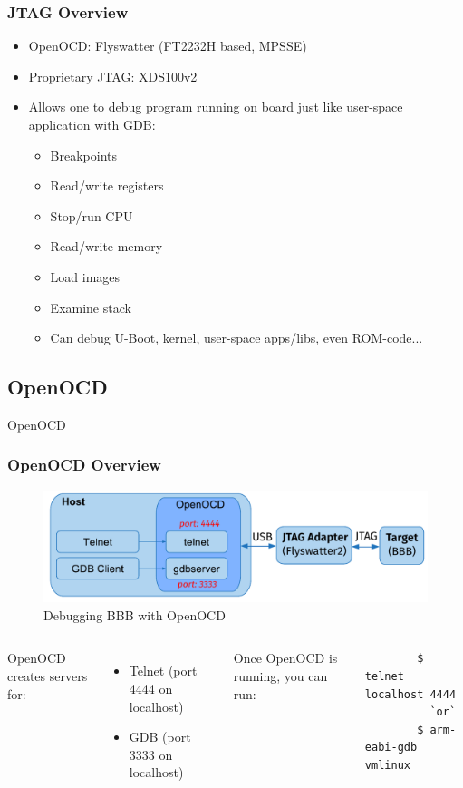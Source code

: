 \begin{frame}
  \frametitle{JTAG Overview}
  \begin{itemize}
    \item OpenOCD: Flyswatter (FT2232H based, MPSSE)
    \item Proprietary JTAG: XDS100v2
    \item Allows one to debug program running on board just like user-space
          application with GDB:
      \begin{itemize}
        \item Breakpoints
        \item Read/write registers
        \item Stop/run CPU
        \item Read/write memory
        \item Load images
        \item Examine stack
        \item Can debug U-Boot, kernel, user-space apps/libs, even ROM-code...
      \end{itemize}
  \end{itemize}
\end{frame}

\subsection{OpenOCD}

\begin{frame}[standout]
  OpenOCD
\end{frame}

\begin{frame}[containsverbatim]
  \frametitle{OpenOCD Overview}
  \begin{figure}
    \centering
    \includegraphics[scale=0.6]{images/openocd.pdf}
    \caption{Debugging BBB with OpenOCD}
  \end{figure}
  \begin{columns}
      OpenOCD creates servers for:
      \begin{itemize}
        \item Telnet (port 4444 on localhost)
        \item GDB (port 3333 on localhost)
      \end{itemize}
      Once OpenOCD is running, you can run:
      \begin{lstlisting}
        $ telnet localhost 4444
          `or`
        $ arm-eabi-gdb vmlinux
      \end{lstlisting}
  \end{columns}
\end{frame}

